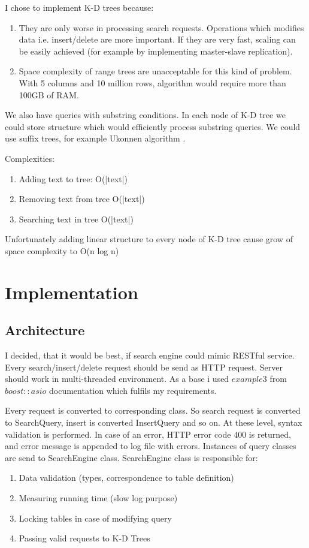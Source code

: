 \documentclass{llncs}
\begin{document}
\bigskip

I chose to implement K-D trees because:
\begin{enumerate}
\item They are only worse in processing search requests. Operations which modifies data i.e. insert/delete are more important. If they are very fast, scaling can be easily achieved (for example by implementing master-slave replication).
\item Space complexity of range trees are unacceptable for this kind of problem. With 5 columns and 10 million rows, algorithm would require more than 100GB of RAM.
\end{enumerate}

\bigskip
We also have queries with substring conditions. In each node of K-D tree we could store structure which would efficiently process substring queries. We could use suffix trees, for example Ukonnen algorithm \cite{STUKK} .

Complexities:
\begin{enumerate}
\item Adding text to tree: O(|text|)
\item Removing text from tree O(|text|)
\item Searching text in tree O(|text|)
\end{enumerate}

Unfortunately adding linear structure to every node of K-D tree cause grow of space complexity to O(n
log n)

\section{Implementation}

\subsection{Architecture}
I decided, that it would be best, if search engine could mimic RESTful service. Every search/insert/delete request should be send as HTTP request. Server should work in multi-threaded
environment. As a base i used $example3$ \cite{ASIOHTTP} from $boost::asio$ documentation which fulfils my
requirements.

Every request is converted to corresponding class. So search request is converted to SearchQuery,
insert is converted InsertQuery and so on. At these level, syntax validation is performed. In case of an
error, HTTP error code 400 is returned, and error message is appended to log file with errors.
Instances of query classes are send to SearchEngine class. SearchEngine class is responsible for:
\begin{enumerate}
\item Data validation (types, correspondence to table definition)
\item Measuring running time (slow log purpose)
\item Locking tables in case of modifying query
\item Passing valid requests to K-D Trees
\end{enumerate}
\end{document}
